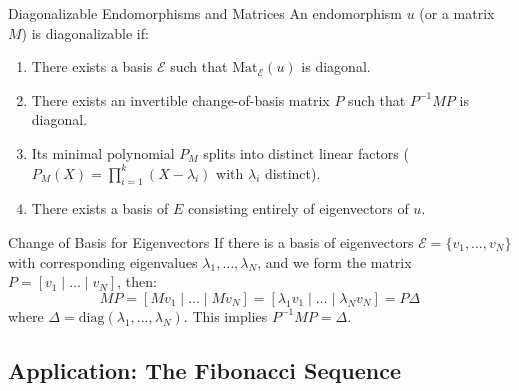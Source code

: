 \documentclass[11pt, a4paper]{article}
\begin{document}
\begin{theorem}{Diagonalizable Endomorphisms and Matrices}{}
An endomorphism $u$ (or a matrix $M$) is diagonalizable if:
\begin{enumerate}
    \item There exists a basis $\mathcal{E}$ such that $\text{Mat}_{\mathcal{E}}(u)$ is diagonal.
    \item There exists an invertible change-of-basis matrix $P$ such that $P^{-1}MP$ is diagonal.
    \item Its minimal polynomial $P_M$ splits into distinct linear factors ($P_M(X) = \prod_{i=1}^k (X - \lambda_i)$ with $\lambda_i$ distinct).
    \item There exists a basis of $E$ consisting entirely of eigenvectors of $u$.
\end{enumerate}
\end{theorem}

\begin{remark}{Change of Basis for Eigenvectors}{}
If there is a basis of eigenvectors $\mathcal{E} = \{v_1, \dots, v_N\}$ with corresponding eigenvalues $\lambda_1, \dots, \lambda_N$, and we form the matrix $P = [v_1 \mid \dots \mid v_N]$, then:
$$ MP = [Mv_1 \mid \dots \mid Mv_N] = [\lambda_1 v_1 \mid \dots \mid \lambda_N v_N] = P\Delta $$ %
where $\Delta = \text{diag}(\lambda_1, \dots, \lambda_N)$. This implies $P^{-1}MP = \Delta$.
\end{remark}

\subsection{Application: The Fibonacci Sequence}
\end{document}
